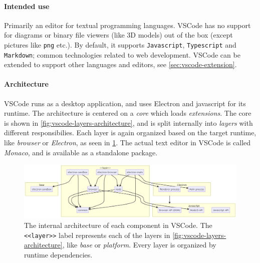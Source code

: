 \paragraph*{Intended use} Primarily an editor for textual programming languages.
VSCode has no support for diagrams or binary file viewers (like 3D models) out of the box (except pictures like \texttt{png} etc.). By default, it supports \texttt{Javascript}, \texttt{Typescript} and \texttt{Markdown}; common technologies related to web development.
VSCode can be extended to support other languages and editors, see \cref{sec:vscode-extension}.


\paragraph*{Architecture}
VSCode runs as a desktop application, and uses Electron and javascript for its runtime.
The architecture is centered on a \emph{core} which loads \emph{extensions}.
The core is shown in \cref{fig:vscode-layers-architecture}, and is split internally into \emph{layers} with different responsibilies.
Each layer is again organized based on the target runtime, like \emph{browser} or \emph{\gls{Electron}}, as seen in \cref{fig:vscode-component-architecture}.
The actual text editor in \gls{VSCode} is called \emph{Monaco}, and is available as a standalone package.~\cite{benjaminpaseroSourceCodeOrganization2020}


\begin{figure}[htbp]
  \centering
  \includegraphics[width=\textwidth]{figures/vscode-component-architecture}
  \caption[VSCode component Architecture]{The internal architecture of each component in VSCode. The \texttt{<<layer>>} label represents each of the layers in \cref{fig:vscode-layers-architecture}, like \emph{base} or \emph{platform}. Every layer is organized by runtime dependencies.~\cite{benjaminpaseroSourceCodeOrganization2020}}\label{fig:vscode-component-architecture}
\end{figure}

